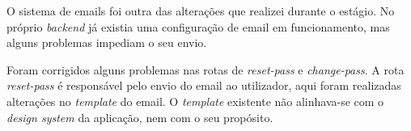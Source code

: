 


O sistema de emails foi outra das alterações que realizei durante o estágio. No próprio \textit{backend} já existia uma configuração de email em funcionamento, mas alguns problemas impediam o seu envio.

Foram corrigidos alguns problemas nas rotas de \textit{reset-pass} e \textit{change-pass}. A rota \textit{reset-pass} é responsável pelo envio do email ao utilizador, aqui foram realizadas alterações no \textit{template} do email. O \textit{template} existente não alinhava-se com o \textit{design system} da aplicação, nem com o seu propósito.

